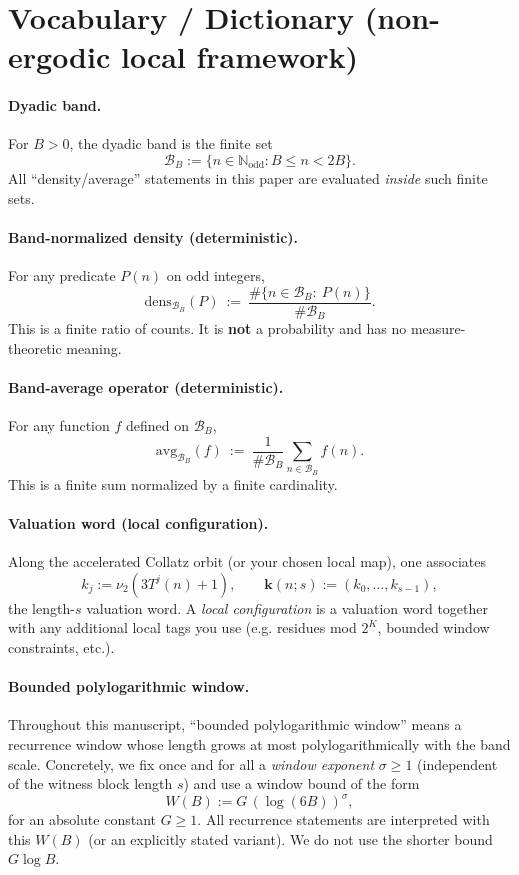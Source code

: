 \documentclass[preprint,12pt]{elsarticle}
\newcommand{\densB}[2]{\mathrm{dens}_{#1}\!\left(#2\right)}
\newcommand{\avgB}[2]{\mathrm{avg}_{#1}\!\left(#2\right)}
\begin{document}
\section*{Vocabulary / Dictionary (non-ergodic local framework)}
\label{sec:vocabulary-local-configs}

\paragraph{Dyadic band.}
For $B>0$, the dyadic band is the finite set
\[
\mathcal{B}_B := \{ n\in\mathbb{N}_{\mathrm{odd}} : B \le n < 2B\}.
\]
All “density/average” statements in this paper are evaluated \emph{inside} such finite sets.

\paragraph{Band-normalized density (deterministic).}
For any predicate $P(n)$ on odd integers,
\[
\densB{\mathcal{B}_B}{P}\ :=\ \frac{\#\{n\in\mathcal{B}_B:\ P(n)\}}{\#\mathcal{B}_B}.
\]
This is a finite ratio of counts. It is \textbf{not} a probability and has no measure-theoretic meaning.

\paragraph{Band-average operator (deterministic).}
For any function $f$ defined on $\mathcal{B}_B$,
\[
\avgB{\mathcal{B}_B}{f}\ :=\ \frac{1}{\#\mathcal{B}_B}\sum_{n\in\mathcal{B}_B} f(n).
\]
This is a finite sum normalized by a finite cardinality.

\paragraph{Valuation word (local configuration).}
Along the accelerated Collatz orbit (or your chosen local map), one associates
\[
k_j := \nu_2(3T^j(n)+1),
\qquad
\mathbf{k}(n;s) := (k_0,\ldots,k_{s-1}),
\]
the length-$s$ valuation word. A \emph{local configuration} is a valuation word together with any additional local tags you use (e.g. residues mod $2^K$, bounded window constraints, etc.).

\paragraph{Bounded polylogarithmic window.}
Throughout this manuscript, ``bounded polylogarithmic window'' means a recurrence window whose length grows at most polylogarithmically with the band scale.
Concretely, we fix once and for all a \emph{window exponent} $\sigma\ge 1$ (independent of the witness block length $s$) and use a window bound of the form
\[
W(B) := G\,(\log(6B))^{\sigma},
\]
for an absolute constant $G\ge 1$.
All recurrence statements are interpreted with this $W(B)$
(or an explicitly stated variant). We do not use the shorter bound $G\log B$.
\end{document}

